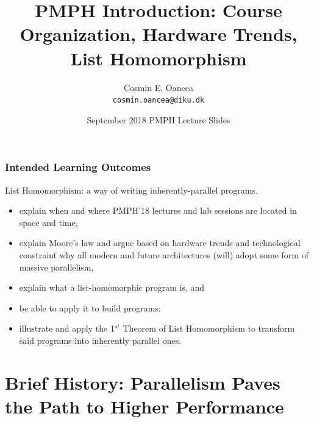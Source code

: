 \documentclass{beamer}
\title[Intro]{PMPH Introduction: Course Organization, Hardware Trends, List Homomorphism}
\author[C.~Oancea]{Cosmin E. Oancea\\{\tt cosmin.oancea@diku.dk}}
\institute{Department of Computer Science (DIKU)\\University of Copenhagen}
\date[Sept 2018]{September 2018 PMPH Lecture Slides}
\begin{document}
\titleslide




\begin{frame}[fragile,t]
\frametitle{Intended Learning Outcomes}

List Homomorphism: a way of writing inherently-parallel programs.
\bigskip

\begin{itemize}
    \item explain when and where PMPH'18 lectures and lab sessions 
            are located in space and time, \bigskip

    \item explain Moore's law and argue based on hardware trends 
            and technological constraint
            why all modern and future architectures (will)
            adopt some form of massive parallelism,\bigskip

    \item explain what a list-homomorphic program is, and 
    \item be able to apply it to build programs;
    \item illustrate and apply the 1$^{st}$ Theorem of List Homomorphism 
                to transform said programs into inherently parallel ones.
\end{itemize}
\end{frame}


\begin{frame}[fragile]
	\tableofcontents
\end{frame}

\section{Brief History: Parallelism Paves the Path to Higher Performance}
\end{document}
